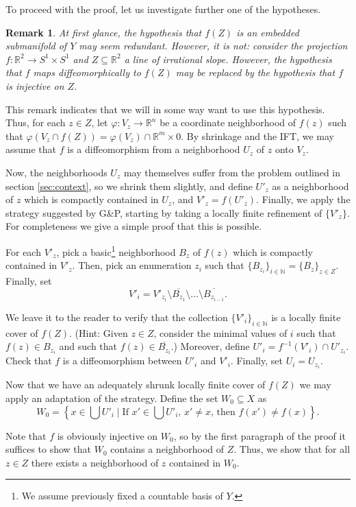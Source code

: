 \documentclass{article}
\def\mbb#1{\mathbb{#1}}
\def\N{\mbb{N}}
\def\R{\mbb{R}}
\newtheorem{remark}{Remark}
\theoremstyle{definition}
\newcommand{\close}[1]{\overline{#1}}
\begin{document}
To proceed with the proof, let us investigate further one of the hypotheses.

\begin{remark}
At first glance, the hypothesis that $f(Z)$ is an embedded submanifold of $Y$ may seem redundant. However, it is not: consider the projection $f \colon \R^2 \to S^1 \times S^1$ and $Z \subseteq \R^2$ a line of irrational slope. However, the hypothesis that $f$ maps diffeomorphically to $f(Z)$ may be replaced by the hypothesis that $f$ is injective on $Z$.
\end{remark}

This remark indicates that we will in some way want to use this hypothesis. Thus, for each $z \in Z$, let $\varphi \colon V_z \to \R^n$ be a coordinate neighborhood of $f(z)$ such that $\varphi(V_z \cap f(Z)) = \varphi(V_z) \cap \R^m \times 0$. By shrinkage and the IFT, we may assume that $f$ is a diffeomorphism from a neighborhood $U_z$ of $z$ onto $V_z$.

Now, the neighborhoods $U_z$ may themselves suffer from the problem outlined in section \ref{sec:context}, so we shrink them slightly, and define $U'_z$ as a neighborhood of $z$ which is compactly contained in $U_z$, and $V'_z = f(U'_z)$. Finally, we apply the strategy suggested by G\&P, starting by taking a locally finite refinement of $\{V'_z\}$. For completeness we give a simple proof that this is possible.

For each $V'_z$, pick a basic\footnote{We assume previously fixed a countable basis of $Y$.} neighborhood $B_z$ of $f(z)$ which is compactly contained in $V'_z$. Then, pick an enumeration $z_i$ such that $\{B_{z_i}\}_{i \in \N} = \{B_z\}_{z \in Z}$. Finally, set
\begin{equation}
V'_i = V'_{z_i} \setminus \close{B_{z_1}} \setminus \dots \setminus \close{B_{z_{i-1}}}.
\end{equation}

We leave it to the reader to verify that the collection $\{V'_i\}_{i \in \N}$ is a locally finite cover of $f(Z)$. (Hint: Given $z \in Z$, consider the minimal values of $i$ such that $f(z) \in B_{z_i}$ and such that $f(z) \in \close{B_{z_i}}$.) Moreover, define $U'_i = f^{-1}(V'_i) \cap U'_{z_i}$. Check that $f$ is a diffeomorphism between $U'_i$ and $V'_i$. Finally, set $U_i = U_{z_i}$.

Now that we have an adequately shrunk locally finite cover of $f(Z)$ we may apply an adaptation of the strategy. Define the set $W_0 \subseteq X$ as
\begin{equation}
W_0 = \left\{x \in \bigcup U'_i \mid \text{If $x' \in \bigcup U'_i$, $x' \neq x$, then $f(x') \neq f(x)$}\right\}.
\end{equation}

Note that $f$ is obviously injective on $W_0$, so by the first paragraph of the proof it suffices to show that $W_0$ contains a neighborhood of $Z$. Thus, we show that for all $z \in Z$ there exists a neighborhood of $z$ contained in $W_0$.
\end{document}
